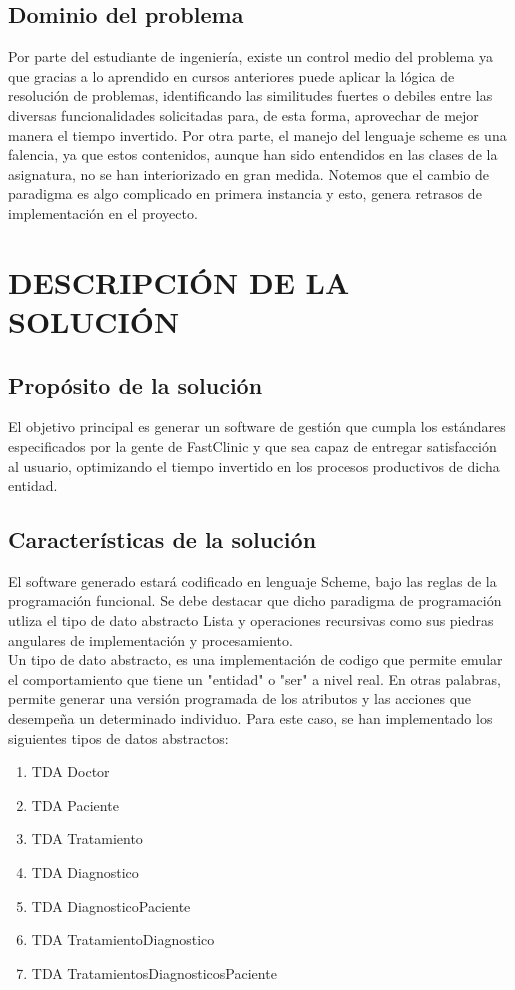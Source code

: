 \documentclass[12pt,letterpaper]{article}
\begin{document}
	\subsection{Dominio del problema}
	Por parte del estudiante de ingeniería, existe un control medio del problema ya que gracias a lo aprendido en cursos anteriores puede aplicar la lógica de resolución de problemas, identificando las similitudes fuertes o debiles entre las diversas funcionalidades solicitadas para, de esta forma, aprovechar de mejor manera el tiempo invertido. Por otra parte,  el manejo del lenguaje scheme es una falencia, ya que estos contenidos, aunque han sido entendidos en las clases de la asignatura, no se han interiorizado en gran medida. Notemos que el cambio de paradigma es algo complicado en primera instancia y esto, genera retrasos de implementación en el proyecto. 

\section{DESCRIPCIÓN DE LA SOLUCIÓN}
	\subsection{Propósito de la solución}
	El objetivo principal es generar un software de gestión que cumpla los estándares especificados por la gente de FastClinic y que sea capaz de entregar satisfacción al usuario, optimizando el tiempo invertido en los procesos productivos de dicha entidad.
	
	\subsection{Características de la solución}
	El software generado estará codificado en lenguaje Scheme, bajo las reglas de la programación funcional. Se debe destacar que dicho paradigma de programación utliza el tipo de dato abstracto Lista y operaciones recursivas como sus piedras angulares de implementación y procesamiento.\\
   
   Un tipo de dato abstracto, es una implementación de codigo que permite emular el comportamiento que tiene un "entidad" o "ser" a nivel real. En otras palabras, permite generar una versión programada de los atributos y las acciones que desempeña un determinado individuo. Para este caso, se han implementado los siguientes tipos de datos abstractos:
    \begin{enumerate}
	\item TDA Doctor
	\item TDA Paciente
	\item TDA Tratamiento
	\item TDA Diagnostico
	\item TDA DiagnosticoPaciente
	\item TDA TratamientoDiagnostico
	\item TDA TratamientosDiagnosticosPaciente
	\end{enumerate}
\end{document}
